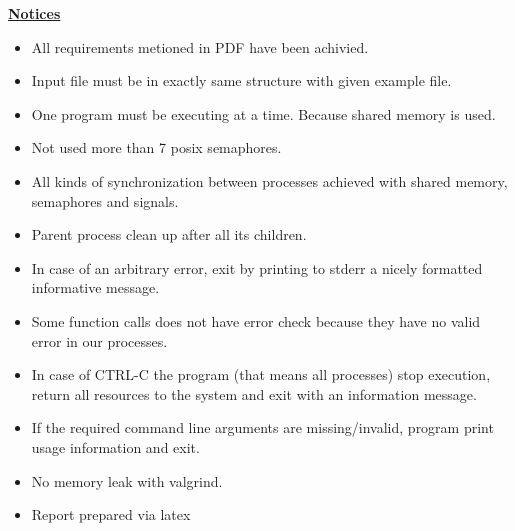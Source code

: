 \documentclass[12pt]{report}
\renewcommand{\_}{\kern-1.5pt\textunderscore\kern-1.5pt}
\begin{document}
\vspace{\baselineskip}
\begin{FlushLeft}
{\fontsize{16pt}{19.2pt}\selectfont \textbf{\uline{Notices}}}
\end{FlushLeft}
\begin{itemize}
	\item All requirements metioned in PDF have been achivied.
	\item Input file must be in exactly same structure with given example file.
	\item One program must be executing at a time. Because shared memory is used.
	\item Not used more than 7 posix semaphores.
\setlength{\parskip}{0.0pt}
	\item All kinds of synchronization between processes achieved with shared memory, semaphores and signals.
\setlength{\parskip}{8.04pt}
	\item Parent process clean up after all its children.
	\item In case of an arbitrary error, exit by printing to stderr a nicely formatted informative message.
	\item Some function calls does not have error check because they have no valid error in our processes.
	\item In case of CTRL-C the program (that means all processes) stop execution, return all resources to the system and exit with an information message.
	\item If the required command line arguments are missing/invalid, program print usage information and exit.
	\item No memory leak with valgrind.
	\item Report prepared via latex
\end{itemize}

\vspace{\baselineskip}
\printbibliography
\end{document}
